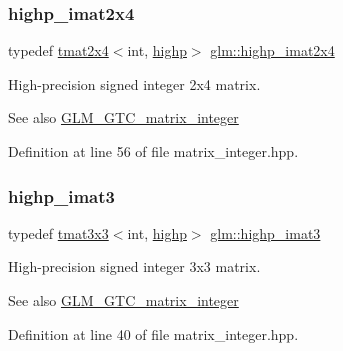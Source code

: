 \subsubsection{\texorpdfstring{highp\_imat2x4}{highp\_imat2x4}}
{\footnotesize\ttfamily typedef \mbox{\hyperlink{structglm_1_1tmat2x4}{tmat2x4}}$<$int, \mbox{\hyperlink{namespaceglm_a0f04f086094c747d227af4425893f545ac6f7eab42eacbb10d59a58e95e362074}{highp}}$>$ \mbox{\hyperlink{group__gtc__matrix__integer_gae7502957eb2ab9268726d87389ae2b55}{glm\+::highp\+\_\+imat2x4}}}

High-\/precision signed integer 2x4 matrix. \begin{DoxySeeAlso}{See also}
\mbox{\hyperlink{group__gtc__matrix__integer}{G\+L\+M\+\_\+\+G\+T\+C\+\_\+matrix\+\_\+integer}} 
\end{DoxySeeAlso}


Definition at line 56 of file matrix\+\_\+integer.\+hpp.

\mbox{\label{group__gtc__matrix__integer_ga0766d11d0154f42893ef0912ab7c6a2c}} 
\subsubsection{\texorpdfstring{highp\_imat3}{highp\_imat3}}
{\footnotesize\ttfamily typedef \mbox{\hyperlink{structglm_1_1tmat3x3}{tmat3x3}}$<$int, \mbox{\hyperlink{namespaceglm_a0f04f086094c747d227af4425893f545ac6f7eab42eacbb10d59a58e95e362074}{highp}}$>$ \mbox{\hyperlink{group__gtc__matrix__integer_ga0766d11d0154f42893ef0912ab7c6a2c}{glm\+::highp\+\_\+imat3}}}

High-\/precision signed integer 3x3 matrix. \begin{DoxySeeAlso}{See also}
\mbox{\hyperlink{group__gtc__matrix__integer}{G\+L\+M\+\_\+\+G\+T\+C\+\_\+matrix\+\_\+integer}} 
\end{DoxySeeAlso}


Definition at line 40 of file matrix\+\_\+integer.\+hpp.

\mbox{\label{group__gtc__matrix__integer_ga2c8dc817124f44bc01f27777bfce983b}} 
